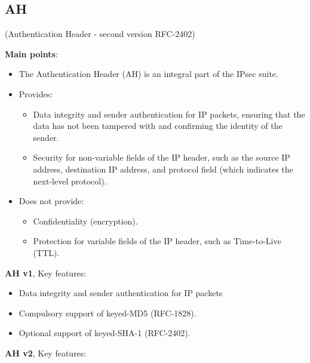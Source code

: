 \subsection{AH}
\begin{center}
    (Authentication Header - second version RFC-2402)
\end{center}
\textbf{Main points}:
\begin{itemize}
    \item The Authentication Header (AH) is an integral part of the IPsec suite.
    \item Provides:
    \begin{itemize}
        \item Data integrity and sender authentication for IP packets, ensuring that the data has not been tampered with and confirming the identity of the sender.
        \item Security for non-variable fields of the IP header, such as the source IP address, destination IP address, and protocol field (which indicates the next-level protocol).
    \end{itemize}
    \item Does not provide:
    \begin{itemize}
        \item Confidentiality (encryption).
        \item Protection for variable fields of the IP header, such as Time-to-Live (TTL).
    \end{itemize}
\end{itemize}

\hfill

\textbf{AH v1}, Key features:

\begin{itemize}
    \item Data integrity and sender authentication for IP packets
    \item Compulsory support of keyed-MD5 (RFC-1828).
    \item Optional support of keyed-SHA-1 (RFC-2402).
\end{itemize}

\hfill

\textbf{AH v2}, Key features:

